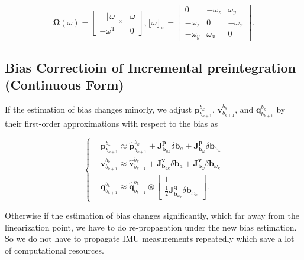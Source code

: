 \documentclass[12pt]{report}   %
\begin{document}
\begin{equation}
\bm{\Omega}\left( \omega \right) = 
\begin{bmatrix}
	- \lfloor \omega \rfloor _ \times & \omega \\
	- \omega ^{\mathrm{T}} & 0
\end{bmatrix}, \lfloor \omega \rfloor _ \times = 
\begin{bmatrix}
	0 & - \omega_z & \omega_y \\
	- \omega_z & 0 & - \omega_x \\
	- \omega_y & \omega_x & 0
\end{bmatrix}.
\label{eq.rot_incremental}
\end{equation}



\subsection{Bias Correctioin of Incremental preintegration (Continuous Form)}

If the estimation of bias changes minorly, we adjust $\bm{p}_{b_{k+1}}^{b_k}$, $\bm{v}_{b_{k+1}}^{b_k}$, and $\bm{q}_{b_{k+1}}^{b_k}$ by their first-order approximations with respect to the bias as

\begin{equation}
\left\{
\begin{aligned}
&\bm{p}_{b_{k+1}}^{b_k}\approx\hat{\bm{p}}_{b_{k+1}}^{b_k}+\bm{J}^{\bm{p}}_{\bm{b}_{ak}}\delta\bm{b}_a+\bm{J}^{\bm{p}}_{\bm{b}_\omega}\delta\bm{b}_{\omega_k} \\
&\bm{v}_{b_{k+1}}^{b_k}\approx\hat{\bm{v}}_{b_{k+1}}^{b_k}+\bm{J}^{\bm{v}}_{\bm{b}_{ak}}\delta\bm{b}_a+\bm{J}^{\bm{v}}_{\bm{b}_\omega}\delta\bm{b}_{\omega_k} \\
&\bm{q}_{b_{k+1}}^{b_k}\approx\hat{\bm{q}}_{b_{k+1}}^{b_k}\otimes 
	\begin{bmatrix}
		1 \\ \frac{1}{2}\bm{J}^{\bm{q}}_{\bm{b}_{\omega_k}}\delta\bm{b}_{\omega_k}
	\end{bmatrix}.
\end{aligned}
\right.
\label{eq.bias_correction}
\end{equation}

Otherwise if the estimation of bias changes significantly, which far away from the linearization point, we have to do re-propagation under the new bias estimation. So we do not have to propagate IMU measurements repeatedly which save a lot of computational resources.
\end{document}
